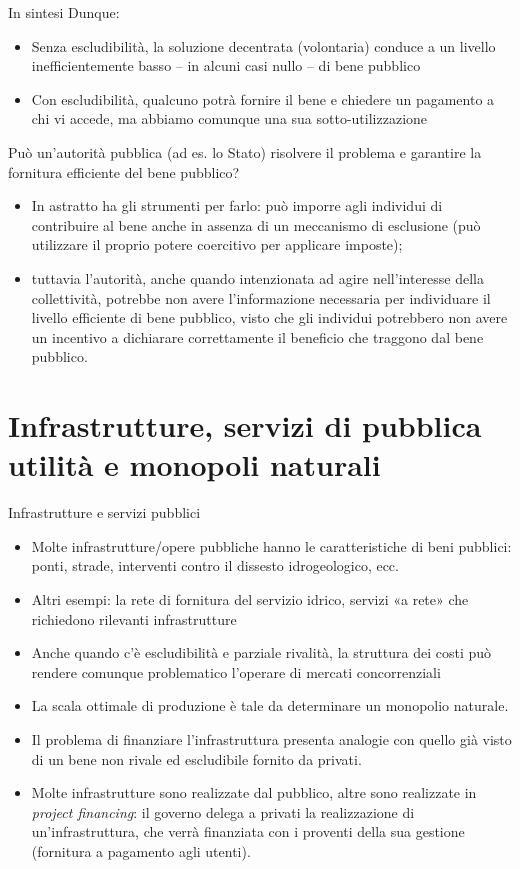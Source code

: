 \documentclass[aspectratio=64,12pt]{beamer}
\begin{document}
\begin{frame}{In sintesi}
Dunque:
\begin{itemize}
\item Senza escludibilità, la soluzione decentrata (volontaria) conduce a un
livello inefficientemente basso -- in alcuni casi nullo -- di bene pubblico
\item Con escludibilità, qualcuno potrà fornire il bene e chiedere un pagamento a
chi vi accede, ma abbiamo comunque una sua sotto-utilizzazione
\end{itemize}
Può un'\alert{autorità pubblica} (ad es. lo Stato) risolvere il problema e garantire la fornitura efficiente del bene pubblico?
\begin{itemize}
\item In astratto ha gli strumenti per farlo: può imporre agli individui di
contribuire al bene anche in assenza di un meccanismo di esclusione (può
utilizzare il proprio potere coercitivo per applicare \alert{imposte});
\item tuttavia l'autorità, anche quando intenzionata ad agire nell'interesse della
collettività, potrebbe non avere l'\alert{informazione} necessaria per individuare
il livello efficiente di bene pubblico, visto che gli individui potrebbero
non avere un incentivo a dichiarare correttamente il beneficio che traggono dal
bene pubblico.
\end{itemize}
\end{frame}


\section{Infrastrutture, servizi di pubblica utilità e monopoli naturali}


\begin{frame}{Infrastrutture e servizi pubblici}
\begin{itemize}
\item Molte infrastrutture/opere pubbliche hanno le caratteristiche di beni
pubblici: ponti, strade, interventi contro il dissesto idrogeologico,
ecc.
\item Altri esempi: la rete di fornitura del servizio idrico, servizi «a rete» che
richiedono rilevanti infrastrutture
\item Anche quando c'è escludibilità e parziale rivalità, la struttura dei
  costi può rendere comunque problematico l'operare di mercati concorrenziali
\item La scala ottimale di produzione è tale da determinare un
  \alert{monopolio naturale}.
\item Il problema di finanziare l'infrastruttura presenta analogie con quello
  già visto di un bene non rivale ed escludibile fornito da privati.
\item Molte infrastrutture sono realizzate dal pubblico, altre sono realizzate in
\emph{project financing}: il governo delega a privati la realizzazione di
un'infrastruttura, che verrà finanziata con i proventi della sua gestione
(fornitura a pagamento agli utenti).
\end{itemize}
\end{frame}
\end{document}
